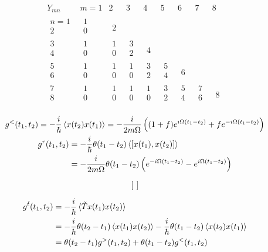 \documentclass{article}
\newcommand\MyTwoRowBox[2]{\boxed{\begin{matrix} #1\\#2\end{matrix}}}
\newcommand\MyTwoRow[2]{\begin{matrix} #1\\#2\end{matrix}}
\begin{document}
\[
    \begin{matrix}
        Y_{mn} & m=1 & 2 & 3 & 4 & 5 & 6 & 7 & 8 \\
        \MyTwoRow{n=1}{2} & \MyTwoRowBox{1}{0} & \MyTwoRow{}{2} & & & & & & \\
        \MyTwoRow{3}{4} & \MyTwoRowBox{1}{0} & \MyTwoRowBox{1}{0} & \MyTwoRow{3}{2} & \MyTwoRow{}{4} & & & & \\
        \MyTwoRow{5}{6} & \MyTwoRowBox{1}{0} & \MyTwoRowBox{1}{0} & \MyTwoRowBox{1}{0} & \MyTwoRow{3}{2} & \MyTwoRow{5}{4} & \MyTwoRow{}{6} & & \\
        \MyTwoRow{7}{8} & \MyTwoRowBox{1}{0} & \MyTwoRowBox{1}{0} & \MyTwoRowBox{1}{0} & \MyTwoRowBox{1}{0} & \MyTwoRow{3}{2} & \MyTwoRow{5}{4} & \MyTwoRow{7}{6} & \MyTwoRow{}{8} \\
    \end{matrix}
\]

\begin{gather}
    g^< (t_1,t_2) = -\frac{i}{\hbar}\braket{x(t_2)x(t_1)} = -\frac{i}{2m\Omega}\left( (1+f) e^{i\Omega (t_1-t_2)} + fe^{-i\Omega (t_1-t_2)} \right) \\
    \begin{aligned}
        g^r (t_1,t_2) &= -\frac{i}{\hbar}\theta (t_1-t_2) \Braket{\left[ x(t_1) ,x(t_2) \right]}\\
        &= -\frac{i}{2m\Omega}\theta (t_1-t_2) \left( e^{-i\Omega (t_1-t_2)} - e^{i\Omega (t_1-t_2)} \right)
    \end{aligned}
\end{gather}

\[ [] \]

\begin{equation}
    \begin{aligned}
        g^{\tilde{t}} (t_1,t_2) &= -\frac{i}{\hbar} \braket{\tilde{T} x(t_1)x(t_2)}\\
        &= -\frac{i}{\hbar}\theta (t_2-t_1) \braket{x(t_1)x(t_2)} - \frac{i}{\hbar}\theta (t_1-t_2) \braket{x(t_2)x(t_1)}\\
        &= \theta (t_2-t_1) g^> (t_1,t_2) + \theta (t_1-t_2) g^< (t_1,t_2)
    \end{aligned}
\end{equation}
\end{document}
